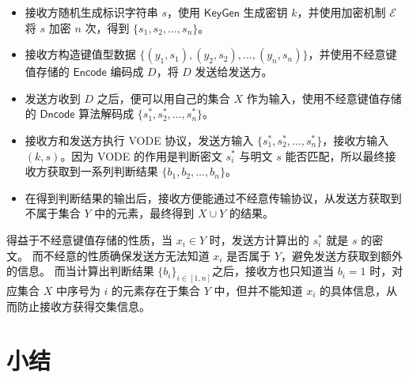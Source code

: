 \begin{itemize}
  \item 接收方随机生成标识字符串 $s$，使用 $\mathsf{KeyGen}$ 生成密钥 $k$，并使用加密机制 $\mathcal{E}$ 将 $s$ 加密 $n$ 次，得到 $\{s_1, s_2, \dots, s_n\}$。
  \item 接收方构造键值型数据 $\{(y_1, s_1), (y_2, s_2), \dots, (y_n, s_n)\}$，并使用不经意键值存储的 $\mathsf{Encode}$ 编码成 $D$，将 $D$ 发送给发送方。
  \item 发送方收到 $D$ 之后，便可以用自己的集合 $X$ 作为输入，使用不经意键值存储的 $\mathsf{Dncode}$ 算法解码成 $\{s_1^*, s_2^*, \dots, s_n^*\}$。
  \item 接收方和发送方执行 VODE 协议，发送方输入 $\{s_1^*, s_2^*, \dots, s_n^*\}$，接收方输入 $(k, s)$。因为 VODE 的作用是判断密文 $s_i^*$ 与明文 $s$ 能否匹配，所以最终接收方获取到一系列判断结果 $\{b_1, b_2, \dots, b_n\}$。
  \item 在得到判断结果的输出后，接收方便能通过不经意传输协议，从发送方获取到不属于集合 $Y$ 中的元素，最终得到 $X\cup Y$ 的结果。
\end{itemize}
得益于不经意键值存储的性质，当 $x_i \in Y$ 时，发送方计算出的 $s_i^*$ 就是 $s$ 的密文。
而不经意的性质确保发送方无法知道 $x_i$ 是否属于 $Y$，避免发送方获取到额外的信息。
而当计算出判断结果 $\{b_i\}_{i\in[1,n]}$之后，接收方也只知道当 $b_i=1$ 时，对应集合 $X$ 中序号为 $i$ 的元素存在于集合 $Y$ 中，但并不能知道 $x_i$ 的具体信息，从而防止接收方获得交集信息。


\section{小结}

